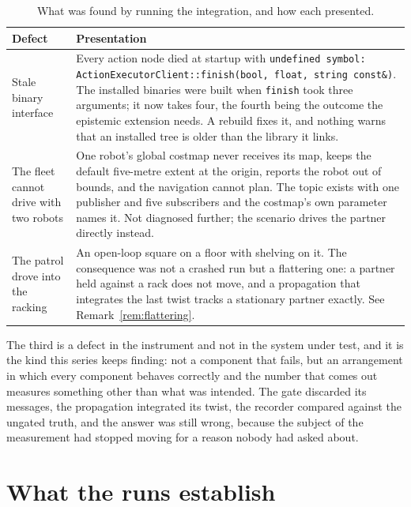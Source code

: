\documentclass[11pt,a4paper]{article}
\theoremstyle{definition}
\newcommand{\code}[1]{\texttt{\small #1}}
\begin{document}
\begin{table}[H]
\centering\small
\caption{What was found by running the integration, and how each presented.}
\label{tab:defects}
\begin{tabularx}{\textwidth}{@{}p{}X@{}}
\toprule
\textbf{Defect} & \textbf{Presentation} \\
\midrule
Stale binary interface &
Every action node died at startup with \code{undefined symbol:
ActionExecutorClient::finish(bool, float, string const\&)}. The installed
binaries were built when \code{finish} took three arguments; it now takes four,
the fourth being the outcome the epistemic extension needs. A rebuild fixes it,
and nothing warns that an installed tree is older than the library it links. \\
\addlinespace
The fleet cannot drive with two robots &
One robot's global costmap never receives its map, keeps the default five-metre
extent at the origin, reports the robot out of bounds, and the navigation
cannot plan. The topic exists with one publisher and five subscribers and the
costmap's own parameter names it. Not diagnosed further; the scenario drives
the partner directly instead. \\
\addlinespace
The patrol drove into the racking &
An open-loop square on a floor with shelving on it. The consequence was not a
crashed run but a flattering one: a partner held against a rack does not move,
and a propagation that integrates the last twist tracks a stationary partner
exactly. See Remark~\ref{rem:flattering}. \\
\bottomrule
\end{tabularx}
\end{table}

The third is a defect in the instrument and not in the system under test,
and it is the kind this series keeps finding: not a component that fails, but
an arrangement in which every component behaves correctly and the number that
comes out measures something other than what was intended. The gate discarded
its messages, the propagation integrated its twist, the recorder compared
against the ungated truth, and the answer was still wrong, because the subject
of the measurement had stopped moving for a reason nobody had asked about.

\section{What the runs establish}
\label{sec:established}
\end{document}
